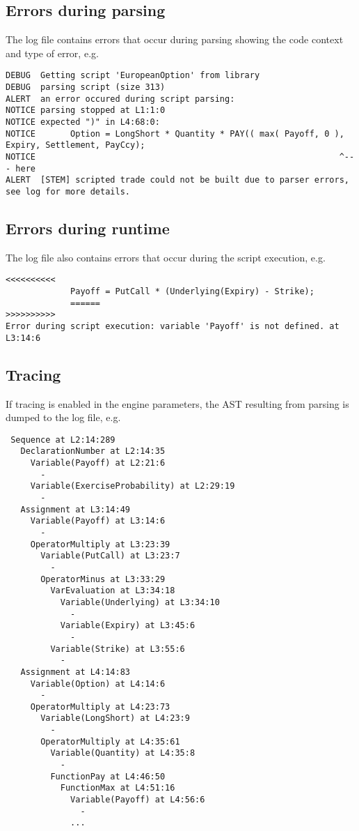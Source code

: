 \subsection{Errors during parsing}

The log file contains errors that occur during parsing showing the code context and type of error, e.g.

\begin{verbatim}
DEBUG  Getting script 'EuropeanOption' from library
DEBUG  parsing script (size 313)
ALERT  an error occured during script parsing:
NOTICE parsing stopped at L1:1:0
NOTICE expected ")" in L4:68:0:
NOTICE       Option = LongShort * Quantity * PAY(( max( Payoff, 0 ), Expiry, Settlement, PayCcy);
NOTICE                                                             ^--- here
ALERT  [STEM] scripted trade could not be built due to parser errors, see log for more details.
\end{verbatim}

\subsection{Errors during runtime}

The log file also contains errors that occur during the script execution, e.g.

\begin{verbatim}
<<<<<<<<<<
             Payoff = PutCall * (Underlying(Expiry) - Strike);
             ======
>>>>>>>>>>
Error during script execution: variable 'Payoff' is not defined. at L3:14:6
\end{verbatim}

\subsection{Tracing}

If tracing is enabled in the engine parameters, the AST resulting from parsing is dumped to the log file, e.g.

\begin{verbatim}
 Sequence at L2:14:289
   DeclarationNumber at L2:14:35
     Variable(Payoff) at L2:21:6
       -
     Variable(ExerciseProbability) at L2:29:19
       -
   Assignment at L3:14:49
     Variable(Payoff) at L3:14:6
       -
     OperatorMultiply at L3:23:39
       Variable(PutCall) at L3:23:7
         -
       OperatorMinus at L3:33:29
         VarEvaluation at L3:34:18
           Variable(Underlying) at L3:34:10
             -
           Variable(Expiry) at L3:45:6
             -
         Variable(Strike) at L3:55:6
           -
   Assignment at L4:14:83
     Variable(Option) at L4:14:6
       -
     OperatorMultiply at L4:23:73
       Variable(LongShort) at L4:23:9
         -
       OperatorMultiply at L4:35:61
         Variable(Quantity) at L4:35:8
           -
         FunctionPay at L4:46:50
           FunctionMax at L4:51:16
             Variable(Payoff) at L4:56:6
               -
             ...
\end{verbatim}

